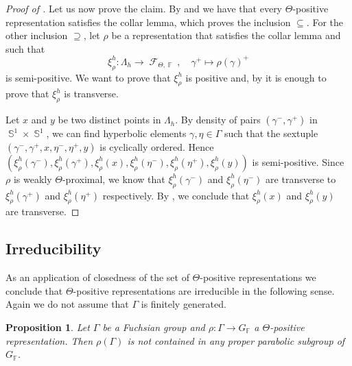 \documentclass{amsart}
\theoremstyle{plain}
\newtheorem{proposition}{Proposition}[section]
\theoremstyle{definition}
\DeclareMathOperator{\Fc}{\mathcal{F}}
\DeclareMathOperator{\Fb}{{\mathbb{F}}}
\DeclareMathOperator{\Sb}{\mathbb{S}}
\newcommand{\1}{\mathbf{1}}
\begin{document}
\begin{proof}[Proof of ]
    Let us now prove the claim. 
    By  and  we have that every $\Theta$-positive representation satisfies the collar lemma, which proves the inclusion $\subseteq$.
    For the other inclusion $\supseteq$, let $\rho$ be a representation that satisfies the collar lemma and such that
    \[
    \xi^h_\rho \colon \Lambda_h \to \Fc_{\Theta,\Fb}, \quad 
    \gamma^+ \mapsto \rho(\gamma)^+
    \]
    is semi-positive.
    We want to prove that $\xi_\rho^h$ is positive and, by  it is enough to prove that $\xi_\rho^h$ is transverse.

    Let $x$ and $y$ be two distinct points in $\Lambda_h$. By density of pairs $(\gamma^-,\gamma^+)$ in $\Sb^1\times \Sb^1$, we can find hyperbolic elements $\gamma, \eta\in \Gamma$ such that the sextuple $(\gamma^-,\gamma^+, x, \eta^-, \eta^+, y)$ is cyclically ordered. Hence $(\xi^h_\rho(\gamma^-), \xi^h_\rho(\gamma^+), \xi^h_\rho(x), \xi^h_\rho(\eta^-), \xi^h_\rho(\eta^+), \xi^h_\rho(y))$ is semi-positive.
    Since $\rho$ is weakly $\Theta$-proximal, we know that $\xi^h_\rho(\gamma^-)$ and $\xi^h_\rho(\eta^-)$ are transverse to $\xi^h_\rho(\gamma^+)$ and $\xi^h_\rho(\eta^+)$ respectively.
    By , we conclude that $\xi^h_\rho(x)$ and $\xi^h_\rho(y)$ are transverse.
\end{proof}

\subsection{Irreducibility}
\label{s: irreducibility}

As an application of closedness of the set of $\Theta$-positive representations we conclude that $\Theta$-positive representations are irreducible in the following sense.
Again we do not assume that $\Gamma$ is finitely generated.

\begin{proposition}
\label{propo: positive implies irreducible}
    Let $\Gamma$ be a Fuchsian group and $\rho \colon \Gamma \to G_{\Fb}$ a $\Theta$-positive representation.
    Then $\rho(\Gamma)$ is not contained in any proper parabolic subgroup of $G_{\Fb}$.
\end{proposition}
\end{document}
